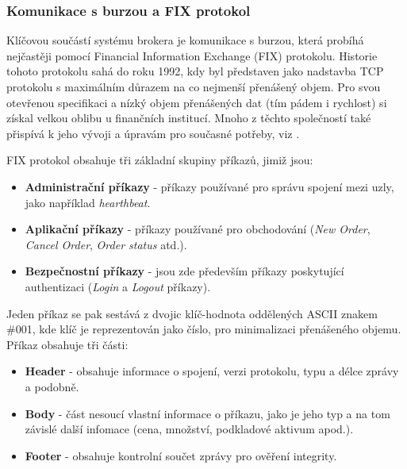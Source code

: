 \documentclass[thesis=M,czech]{FITthesis}[2012/06/26]
\begin{document}
\subsubsection{Komunikace s burzou a FIX protokol}
\label{sec:fix_protocol}
	
	Klíčovou součástí systému brokera je komunikace s burzou, která probíhá nejčastěji pomocí Financial Information Exchange (FIX) protokolu. Historie tohoto protokolu sahá do roku 1992, kdy byl představen jako nadstavba TCP protokolu s maximálním důrazem na co nejmenší přenášený objem. Pro svou otevřenou specifikaci a nízký objem přenášených dat (tím pádem i rychlost) si získal velkou oblibu u finančních institucí. Mnoho z těchto společností také přispívá k jeho vývoji a úpravám pro současné potřeby, viz \cite{FIXAbout}.
	
	FIX protokol obsahuje tři základní skupiny příkazů, jimiž jsou:

\begin{itemize}
	\item \textbf{Administrační příkazy} - příkazy používané pro správu spojení mezi uzly, jako například \textit{hearthbeat}.
	
	\item \textbf{Aplikační příkazy} - příkazy používané pro obchodování (\textit{New Order}, \textit{Cancel Order}, \textit{Order status} atd.).

	\item \textbf{Bezpečnostní příkazy} - jsou zde především příkazy poskytující authentizaci (\textit{Login} a \textit{Logout} příkazy).
	
\end{itemize}
	
	Jeden příkaz se pak sestává z dvojic klíč-hodnota oddělených ASCII znakem \#001, kde klíč je reprezentován jako číslo, pro minimalizaci přenášeného objemu. Příkaz obsahuje tři části:
	
	
\begin{itemize}
	\item \textbf{Header} - obsahuje informace o spojení, verzi protokolu, typu a délce zprávy a podobně.
	
	\item \textbf{Body} - část nesoucí vlastní informace o příkazu, jako je jeho typ a na tom závislé další infomace (cena, množství, podkladové aktivum apod.).

	\item \textbf{Footer} - obsahuje kontrolní součet zprávy pro ověření integrity.
	
\end{itemize}
	
\end{document}
